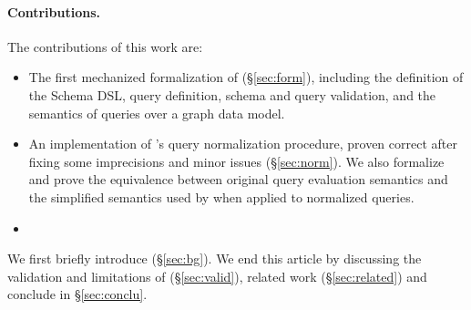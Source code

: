 



\paragraph{Contributions.}
The contributions of this work are:
\begin{itemize}
    \item The first mechanized formalization of \gql (\S\ref{sec:form}), including the definition of the Schema DSL, query definition, schema and query validation, and the semantics of queries over a graph data model.
    \item An implementation of \HP's query normalization procedure, proven correct after fixing some imprecisions and minor issues (\S\ref{sec:norm}). We also formalize and prove the equivalence between original query evaluation semantics and the simplified semantics used by \HP when applied to normalized queries.
    \item {}
\end{itemize}

We first briefly introduce \gql (\S\ref{sec:bg}). 
We end this article by discussing the validation and limitations of \gcoql (\S\ref{sec:valid}), related work (\S\ref{sec:related}) and conclude in \S\ref{sec:conclu}.

